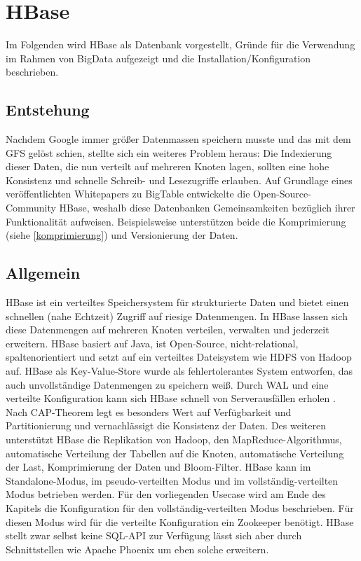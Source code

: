 \section{HBase}



Im Folgenden wird HBase als Datenbank vorgestellt, Gründe  für die Verwendung im Rahmen von BigData aufgezeigt und die Installation/Konfiguration beschrieben.

\subsection{Entstehung}
Nachdem Google immer größer Datenmassen speichern musste und das mit dem  \ac{GFS} gelöst schien, stellte sich ein weiteres Problem heraus: Die Indexierung dieser Daten, die nun verteilt auf mehreren Knoten lagen, sollten eine hohe Konsistenz und schnelle Schreib- und Lesezugriffe erlauben. Auf Grundlage eines veröffentlichten Whitepapers zu BigTable \cite{bigtable} entwickelte die Open-Source-Community HBase, weshalb diese Datenbanken Gemeinsamkeiten bezüglich ihrer Funktionalität aufweisen. Beispielsweise unterstützen beide die Komprimierung (siehe \ref{komprimierung}) und Versionierung der Daten.

\subsection{Allgemein}
HBase ist ein verteiltes Speichersystem für strukturierte Daten und bietet einen schnellen (nahe Echtzeit) Zugriff auf riesige Datenmengen. In HBase lassen sich diese Datenmengen auf mehreren Knoten verteilen, verwalten und jederzeit erweitern. HBase basiert auf Java, ist Open-Source, nicht-relational, spaltenorientiert und setzt auf ein verteiltes Dateisystem wie HDFS von Hadoop auf. HBase als Key-Value-Store wurde als fehlertolerantes System entworfen, das auch unvollständige Datenmengen zu speichern weiß. Durch \ac{WAL} und eine verteilte Konfiguration kann sich HBase schnell von Serverausfällen erholen \cite{Redt01}. Nach CAP-Theorem legt es besonders Wert auf Verfügbarkeit und Partitionierung und vernachlässigt die Konsistenz der Daten. Des weiteren unterstützt HBase die Replikation von Hadoop, den MapReduce-Algorithmus, automatische Verteilung der Tabellen auf die Knoten, automatische Verteilung der Last, Komprimierung der Daten und Bloom-Filter. HBase kann im Standalone-Modus, im pseudo-verteilten Modus und im vollständig-verteilten Modus betrieben werden. Für den vorliegenden Usecase wird am Ende des Kapitels die Konfiguration für den vollständig-verteilten Modus beschrieben. Für diesen Modus wird für die verteilte Konfiguration ein Zookeeper benötigt. HBase stellt zwar selbst keine SQL-API zur Verfügung lässt sich aber durch Schnittstellen wie Apache Phoenix um eben solche erweitern.

